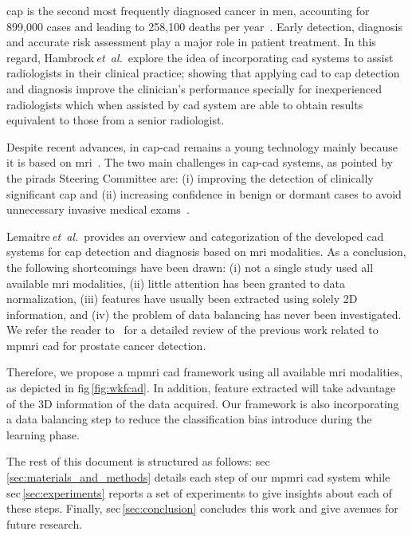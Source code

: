 \documentclass[final,3p,times,twocolumn]{elsarticle}
\begin{document}
\Ac{cap} is the second most frequently diagnosed cancer in men, accounting for
899,000 cases and leading to 258,100 deaths per
year~\citep{ferlay2010estimates}. Early detection, diagnosis and accurate risk
assessment play a major role in patient treatment. In this regard,
Hambrock\,\emph{et~al.}\,\cite{Hambrock2013} explore the idea of
incorporating \ac{cad} systems to assist radiologists in their clinical
practice; showing that applying \ac{cad} to \ac{cap} detection and diagnosis
improve the clinician's performance specially for inexperienced radiologists
which when assisted by \ac{cad} system are able to obtain results equivalent to
those from a senior radiologist.

Despite recent advances, in \ac{cap}-\ac{cad} remains a young technology mainly
because it is based on \ac{mri}~\cite{Hegde2013}. The two main challenges in
\ac{cap}-\ac{cad} systems, as pointed by the \ac{pirads} Steering Committee
are: (i) improving the detection of clinically significant \ac{cap} and (ii)
increasing confidence in benign or dormant cases to avoid unnecessary invasive
medical exams~\citep{weinreb2016pi}.

Lemaitre\,\emph{et~al.}\,\cite{lemaitre2015computer} provides an
overview and categorization of the developed \acs{cad} systems for \ac{cap}
detection and diagnosis based on \ac{mri} modalities. As a conclusion, the
following shortcomings have been drawn: (i) not a single study used all available
\ac{mri} modalities, (ii) little attention has been granted to data
normalization, (iii) features have usually been extracted using solely 2D
information, and (iv) the problem of data balancing has never been
investigated. We refer the reader to~\cite{lemaitre2015computer} for a detailed
review of the previous work related to \ac{mpmri} \ac{cad} for prostate cancer
detection.

Therefore, we propose a \ac{mpmri} \ac{cad} framework using all available
\ac{mri} modalities, as depicted in \acs{fig}\,\ref{fig:wkfcad}. In addition,
feature extracted will take advantage of the 3D information of the data
acquired. Our framework is also incorporating a data balancing step to reduce
the classification bias introduce during the learning phase.

The rest of this document is structured as follows:
\acs{sec}\,\ref{sec:materials_and_methods} details each step of our \ac{mpmri}
\ac{cad} system while \acs{sec}\,\ref{sec:experiments} reports a set of
experiments to give insights about each of these steps. Finally,
\ac{sec}\,\ref{sec:conclusion} concludes this work and give avenues for future
research.
\end{document}
